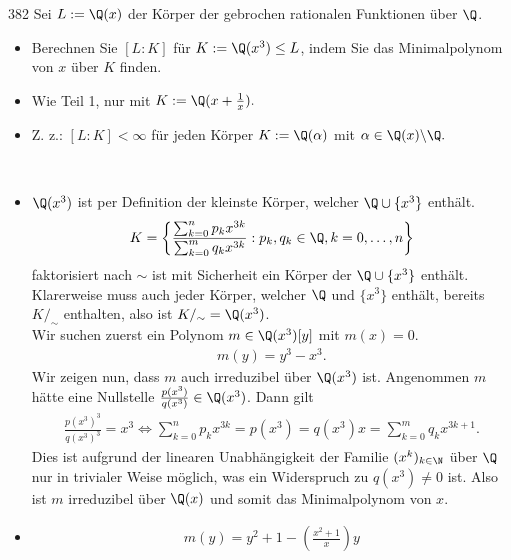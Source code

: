 \begin{algebraUE}{382}
  Sei $L := \Q(x)$ der Körper der gebrochen rationalen Funktionen über $\Q$.
  \begin{itemize}
      \item Berechnen Sie $[L:K]$ für $K:= \Q(x^3) \leq L$, indem Sie das Minimalpolynom von $x$ über $K$ finden.
      \item Wie Teil 1, nur mit $K := \Q(x+\frac{1}{x}).$
      \item Z. z.: $[L:K] < \infty$ für jeden Körper $K := \Q(\alpha)$ mit $\alpha \in \Q(x) \backslash \Q.$
  \end{itemize}
\end{algebraUE}

\begin{solution}
\leavevmode \\
\begin{itemize}
  \item $\Q(x^3)$ ist per Definition der kleinste Körper, welcher $\Q \cup \{x^3\}$
  enthält.
  \begin{align*}
    K = \left\{\frac{\sum_{k=0}^np_kx^{3k}}{\sum_{k=0}^mq_kx^{3k}}: p_k,q_k \in \Q, k = 0,\dots,n\right\}
  \end{align*}
  faktorisiert nach $\sim$ ist mit Sicherheit ein Körper der $\Q \cup \{x^3\}$ enthält. Klarerweise muss
  auch jeder Körper, welcher $\Q$ und $\{x^3\}$ enthält, bereits $K/_{\sim}$ enthalten,
  also ist $K/_{\sim} = \Q(x^3)$. \\
  Wir suchen zuerst ein Polynom $m \in \Q(x^3)[y]$ mit $m(x) = 0$.
    \begin{align*}
        m(y) = y^3 - x^3.
    \end{align*}
    Wir zeigen nun, dass $m$ auch irreduzibel über $\Q(x^3)$ ist. Angenommen $m$
    hätte eine Nullstelle  $\frac{p(x^3)}{q(x^3)} \in \Q(x^3)$. Dann gilt
    \begin{align*}
      \frac{p(x^3)^3}{q(x^3)^3} = x^3
      \iff \sum_{k=0}^np_kx^{3k} = p(x^3) = q(x^3)x = \sum_{k=0}^mq_kx^{3k+1}.
    \end{align*}
    Dies ist aufgrund der linearen Unabhängigkeit der Familie $(x^k)_{k \in \N}$
    über $\Q$ nur in trivialer Weise möglich, was ein Widerspruch zu $q(x^3) \neq 0$ ist.
    Also ist $m$ irreduzibel über $\Q(x)$ und somit das Minimalpolynom von $x$.
  \item \begin{align*}
    m(y) = y^2 + 1 - \left(\frac{x^2 + 1}{x}\right)y
  \end{align*}

\end{itemize}
\end{solution}
